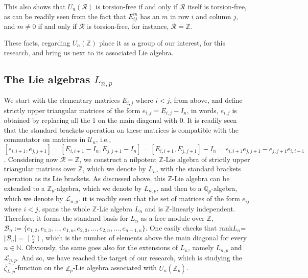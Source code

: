 \documentclass[12pt]{article}
\begin{document}
This also shows that $U_n(\mathcal{R})$ is torsion-free if and only if $\mathcal{R}$ itself is torsion-free, as can be readily seen from the fact that $E_{ij}^m$ has an $m$ in row $i$ and column $j$, and $m\neq 0$ if and only if $\mathcal{R}$ is torsion-free, for instance, $\mathcal{R}=\mathbb{Z}$.\par
These facts, regarding $U_n(\mathbb{Z})$ place it as a group of our interest, for this research, and bring us next to its associated Lie algebra.
\subsection{The Lie algebras $L_{n,p}$}
We start with the elementary matrices $E_{i,j}$ where $i<j$, from above, and define strictly upper triangular matrices of the form $e_{i,j}=E_{i,j}-I_n$, in words, $e_{i,j}$ is obtained by replacing all the $1$ on the main diagonal with $0$. It is readily seen that the standard brackets operation on these matrices is compatible with the commutator on matrices in $\mathcal{U}_n$, i.e., $[e_{i,i+1},e_{j,j+1}]=[E_{i,i+1}-I_n,E_{j,j+1}-I_n]=[E_{i,i+1},E_{j,j+1}]-I_n=e_{i,i+1}e_{j,j+1}-e_{j,j+1}e_{i,i+1}$. Considering now $\mathcal{R}=\mathbb{Z}$, we construct a nilpotent $\mathbb{Z}$-Lie algebra of strictly upper triangular matrices over $\mathbb{Z}$, which we denote by $L_n$, with the standard brackets operation as its Lie brackets. As discussed above, this $\mathbb{Z}$-Lie algebra can be extended to a $\mathbb{Z}_p$-algebra, which we denote by $L_{n,p}$, and then to a $\mathbb{Q}_p$-algebra, which we denote by $\mathcal{L}_{n,p}$.
it is readily seen that the set of matrices of the form $e_{ij}$ where $i<j$, spans the whole $\mathbb{Z}$-Lie algebra $L_n$ and is $\mathbb{Z}$-linearly independent. Therefore, it forms the standard basis for $L_n$ as a free module over $\mathbb{Z}$, $\mathcal{B}_n:=\{e_{1,2},e_{1,3},\dots,e_{1,n},e_{2,3},\dots,e_{2,n},\dots,e_{n-1,n}\}$. One easily checks that rank$L_n$=$|\mathcal{B}_n|=\binom{n}{2}$, which is the number of elements above the main diagonal for every $n\in\mathbb{N}$. Obviously, the same goes also for the extensions of $L_n$, namely $L_{n,p}$ and $\mathcal{L}_{n,p}$. And so, we have reached the target of our research, which is studying the $\hat{\zeta_{L,p}}$-function on the $\mathbb{Z}_p$-Lie algebra associated with $U_n(\mathbb{Z}_p)$.
\end{document}
